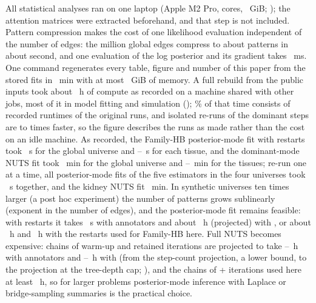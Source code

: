 All statistical analyses ran on one laptop (Apple M2 Pro, \nHwCores{} cores, \nHwRamGiB{}~GiB; ); the attention matrices were extracted beforehand, and that step is not included.
Pattern compression makes the cost of one likelihood evaluation independent of the number of edges: the \nScNRealMio{} million global edges compress to about \nScPRealApprox{} patterns in about \nScCompRealW{} second, and one evaluation of the log posterior and its gradient takes \nScVgRealMs{}~ms.
One command regenerates every table, figure and number of this paper from the stored fits in \nPipeTablesMin{}~min with at most \nPipeTablesPeakGiB{}~GiB of memory.
A full rebuild from the public inputs took about \nPipeFullHours{}~h of compute as recorded on a machine shared with other jobs, most of it in model fitting and simulation (); \nPipeRecordedPct{}\% of that time consists of recorded runtimes of the original runs, and isolated re-runs of the dominant steps are \nPipeIsoRatioMin{} to \nPipeIsoRatioMax{} times faster, so the figure describes the runs as made rather than the cost on an idle machine.
As recorded, the Family-HB posterior-mode fit with \nMapRestartsHb{} restarts took \nRtMapGlob{}~s for the global universe and \nRtMapTisMin{}--\nRtMapTisMax{}~s for each tissue, and the dominant-mode NUTS fit took \nRtNutsGlobMinutes{}~min for the global universe and \nRtNutsTisMinutesMin{}--\nRtNutsTisMinutesMax{}~min for the tissues; re-run one at a time, all posterior-mode fits of the five estimators in the four universes took \nPipeMapIsoS{}~s together, and the kidney NUTS fit \nPipeNutsKidIsoMin{}~min.
In synthetic universes ten times larger (a post hoc experiment) the number of patterns grows sublinearly (exponent \nScPN{} in the number of edges), and the posterior-mode fit remains feasible: with \nScMapRestarts{} restarts it takes \nScMapTenKOne{}~s with \nScKOne{} annotators and about \nScMapTenKTwoHours{}~h (projected) with \nScKTwo{}, or about \nScMapFiftyKOneHours{}~h and \nScMapFiftyKTwoHours{}~h with the \nMapRestartsHb{} restarts used for Family-HB here.
Full NUTS becomes expensive: \nScNutsChains{} chains of \nScNutsWarm{} warm-up and \nScNutsDraw{} retained iterations are projected to take \nScNutsKOneLoHours{}--\nScNutsKOneHiHours{}~h with \nScKOne{} annotators and \nScNutsKTwoLoHours{}--\nScNutsKTwoHiHours{}~h with \nScKTwo{} (from the step-count projection, a lower bound, to the projection at the tree-depth cap; ), and the \nNutsChains{} chains of \nNutsWarmup{} + \nNutsDraws{} iterations used here at least \nScNutsProdMinHours{}~h, so for larger problems posterior-mode inference with Laplace or bridge-sampling summaries is the practical choice.


